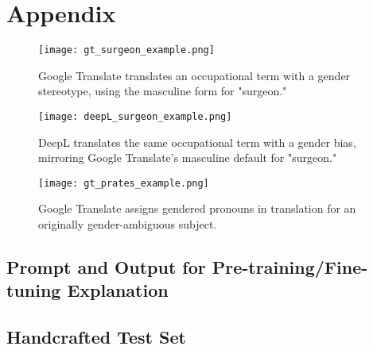 \chapter*{Appendix}

\begin{figure}
	\centering
	\texttt{[image: gt\_surgeon\_example.png]}
	\caption[Example of Google Translate's biased translation]{Google Translate translates an occupational term with a gender stereotype, using the masculine form for "surgeon."}
	\label{fig:gt_surgeon_example}
\end{figure}

\begin{figure}
	\centering
	\texttt{[image: deepL\_surgeon\_example.png]}
	\caption[Example of DeepL's biased translation]{DeepL translates the same occupational term with a gender bias, mirroring Google Translate's masculine default for "surgeon."}
	\label{fig:deepL_surgeon_example}
\end{figure}

\begin{figure}
	\centering
	\texttt{[image: gt\_prates\_example.png]}
	\caption[Google Translate Gendered Pronoun Suggestions]{Google Translate assigns gendered pronouns in translation for an originally gender-ambiguous subject.}
	\label{fig:gt_prates_example}
\end{figure}

\section{Prompt and Output for Pre-training/Fine-tuning Explanation}
\label{appendix:prompt_pdf}


\section{Handcrafted Test Set}
\label{appendix:handcrafted_testset}

